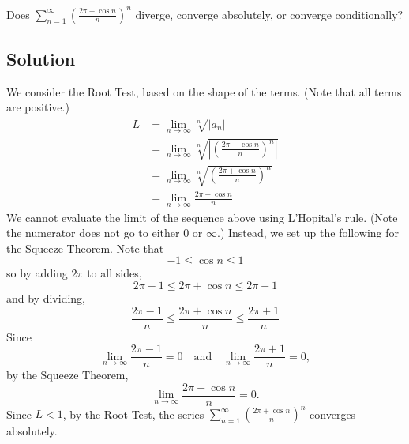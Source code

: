 \documentclass{article}
\begin{document}
\noindent
Does $\displaystyle \sum_{n=1}^\infty \left(\frac{2\pi+\cos n}{n}\right)^n$
diverge, converge absolutely, or converge conditionally?

\subsection*{Solution}

We consider the Root Test, based on the shape of the terms. (Note that all terms are positive.)
\begin{align*}
L&=\lim_{n \to \infty} \sqrt[n]{|a_n|}\\
&= \lim_{n \to \infty} \sqrt[n]{\left| \left(\frac{2\pi+\cos n}{n}\right)^n \right|}\\
&= \lim_{n \to \infty} \sqrt[n]{\left(\frac{2\pi+\cos n}{n}\right)^n }\\
&= \lim_{n \to \infty}\frac{2\pi+\cos n}{n}
\end{align*}
We cannot evaluate the limit of the sequence above using L'Hopital's rule. (Note the numerator does not go to either $0$ or $\infty$.) Instead, we set up the following for the Squeeze Theorem. Note that
\[ -1 \leq \cos n \leq 1\]
so by adding $2\pi$ to all sides,
\[ 2\pi-1 \leq 2\pi+\cos n \leq 2\pi+1\]
and by dividing,
\[ \frac{2\pi-1}{n} \leq \frac{2\pi+\cos n}{n} \leq \frac{2\pi+1}{n}\]
Since
\[ \lim_{n \to \infty} \frac{2\pi-1}{n}  = 0 \quad\text{and}\quad \lim_{n \to \infty} \frac{2\pi+1}{n}  = 0,\]
by the Squeeze Theorem,
\[\lim_{n \to \infty}\frac{2\pi+\cos n}{n}=0.\]
Since $L < 1$, by the Root Test, the series $\displaystyle \sum_{n=1}^\infty \left(\frac{2\pi+\cos n}{n}\right)^n$ converges absolutely.
\end{document}
